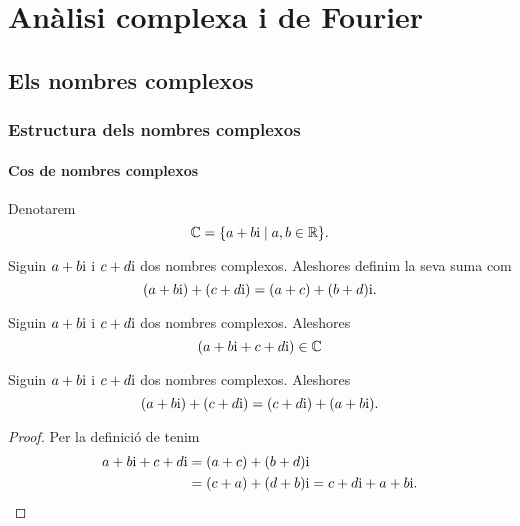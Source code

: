 \documentclass[../../Main.tex]{subfiles}
\begin{document}
\part{Anàlisi complexa i de Fourier}
\chapter{Els nombres complexos}
\section{Estructura dels nombres complexos}
	\subsection{Cos de nombres complexos}
	\begin{notation}
		\label{notation:cos de nombres complexos}
		Denotarem
		\[\mathbb{C}=\{a+b\mathrm{i}\mid a,b\in\mathbb{R}\}.\]
	\end{notation}
	\begin{definition}
        \label{def:suma de nombres complexos}
		Siguin \(a+b\mathrm{i}\) i \(c+d\mathrm{i}\) dos nombres complexos.
        Aleshores definim la seva suma com
		\[(a+b\mathrm{i})+(c+d\mathrm{i})=(a+c)+(b+d)\mathrm{i}.\]
	\end{definition}
	\begin{observation}
		\label{obs:els nombres complexos estan tancats per la suma}
		Siguin \(a+b\mathrm{i}\) i \(c+d\mathrm{i}\) dos nombres complexos.
        Aleshores
		\[(a+b\mathrm{i}+c+d\mathrm{i})\in\mathbb{C}\]
	\end{observation}
	\begin{proposition}
		\label{prop:els nombres complexos commuten per la suma}
		Siguin \(a+b\mathrm{i}\) i \(c+d\mathrm{i}\) dos nombres complexos.
        Aleshores
		\[(a+b\mathrm{i})+(c+d\mathrm{i})=(c+d\mathrm{i})+(a+b\mathrm{i}).\]
		\begin{proof}
			Per la definició de  tenim
			\begin{align*}
				a+b\mathrm{i}+c+d\mathrm{i}&=(a+c)+(b+d)\mathrm{i} \\
				&=(c+a)+(d+b)\mathrm{i}=c+d\mathrm{i}+a+b\mathrm{i}.\qedhere
			\end{align*}
		\end{proof}
	\end{proposition}
\end{document}

